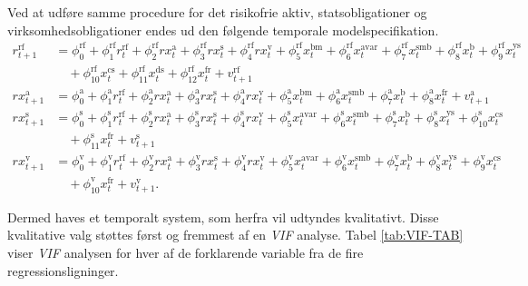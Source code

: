\documentclass[
  a4paper,
  oneside]{memoir}
\begin{document}
Ved at udføre samme procedure for det risikofrie aktiv, statsobligationer og virksomhedsobligationer endes ud den følgende temporale modelspecifikation.
\begin{align*}
r_{t+1}^{\text{rf}}&=\phi_0^{\text{rf}} + \phi_1^{\text{rf}} r_{t}^{\text{rf}} +  \phi_2^{\text{rf}} rx_{t}^{\text{a}} + \phi_3^{\text{rf}} rx_{t}^{\text{s}} + \phi_4^{\text{rf}} rx_{t}^{\text{v}} + \phi_5^{\text{rf}} x_{t}^{\text{bm}} + \phi_6^{\text{rf}} x_{t}^{\text{avar}} + \phi_7^{\text{rf}} x_{t}^{\text{smb}} + \phi_8^{\text{rf}} x_{t}^{\text{b}} + \phi_9^{\text{rf}} x_{t}^{\text{ys}}\\
&\quad+ \phi_{10}^{\text{rf}} x_{t}^{\text{cs}}+ \phi_{11}^{\text{rf}} x_{t}^{\text{ds}} + \phi_{12}^{\text{rf}} x_{t}^{\text{fr}}+v_{t+1}^{\text{rf}}\\
rx_{t+1}^{\text{a}}&=\phi_0^{\text{a}} + \phi_1^{\text{a}} r_{t}^{\text{rf}} +  \phi_2^{\text{a}} rx_{t}^{\text{a}} + \phi_3^{\text{a}} rx_{t}^{\text{s}} + \phi_4^{\text{a}} rx_{t}^{\text{v}} + \phi_5^{\text{a}} x_{t}^{\text{bm}} + \phi_6^{\text{a}} x_{t}^{\text{smb}} + \phi_7^{\text{a}} x_{t}^{\text{b}} + \phi_8^{\text{a}} x_{t}^{\text{fr}}+v_{t+1}^{\text{a}}\\
rx_{t+1}^{\text{s}}&=\phi_0^{\text{s}} + \phi_1^{\text{s}} r_{t}^{\text{rf}} +  \phi_2^{\text{s}} rx_{t}^{\text{a}} + \phi_3^{\text{s}} rx_{t}^{\text{s}} + \phi_4^{\text{s}} rx_{t}^{\text{v}} + \phi_5^{\text{s}} x_{t}^{\text{avar}} + \phi_6^{\text{s}} x_{t}^{\text{smb}} + \phi_7^{\text{s}} x_{t}^{\text{b}} + \phi_8^{\text{s}} x_{t}^{\text{ys}}+ \phi_{10}^{\text{s}} x_{t}^{\text{cs}}\\
&\quad+ \phi_{11}^{\text{s}} x_{t}^{\text{fr}}+v_{t+1}^{\text{s}}\\
rx_{t+1}^{\text{v}}&=\phi_0^{\text{v}}+ \phi_1^{\text{v}} r_{t}^{\text{rf}} +  \phi_2^{\text{v}} rx_{t}^{\text{a}} + \phi_3^{\text{v}} rx_{t}^{\text{s}} + \phi_4^{\text{v}} rx_{t}^{\text{v}} + \phi_5^{\text{v}} x_{t}^{\text{avar}} + \phi_6^{\text{v}} x_{t}^{\text{smb}} + \phi_7^{\text{v}} x_{t}^{\text{b}} + \phi_8^{\text{v}} x_{t}^{\text{ys}}+ \phi_9^{\text{v}} x_{t}^{\text{cs}}\\
&\quad+ \phi_{10}^{\text{v}} x_{t}^{\text{fr}}+v_{t+1}^{\text{v}}.
\end{align*}

Dermed haves et temporalt system, som herfra vil udtyndes kvalitativt. Disse kvalitative valg støttes først og fremmest af en \emph{VIF} analyse. Tabel \ref{tab:VIF-TAB} viser \emph{VIF} analysen for hver af de forklarende variable fra de fire regressionsligninger.
\end{document}
